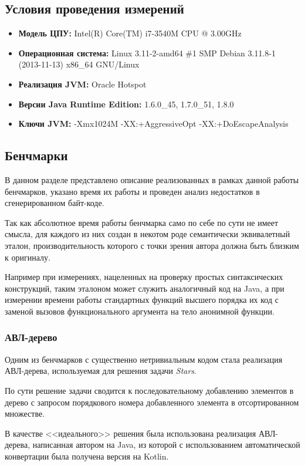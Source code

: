 \subsection{Условия проведения измерений}
\begin{itemize}
    \item \textbf{Модель ЦПУ:} Intel(R) Core(TM) i7-3540M CPU @ 3.00GHz
    \item \textbf{Операционная система:} Linux 3.11-2-amd64 \#1 SMP Debian 3.11.8-1 (2013-11-13) x86\_64 GNU/Linux
    \item \textbf{Реализация JVM:} Oracle Hotspot
    \item \textbf{Версии Java Runtime Edition:} 1.6.0\_45, 1.7.0\_51, 1.8.0
    \item \textbf{Ключи JVM:} -Xmx1024M -XX:+AggressiveOpt -XX:+DoEscapeAnalysis
\end{itemize}

\subsection{Бенчмарки}
В данном разделе представлено описание реализованных в рамках данной работы бенчмарков, указано
время их работы и проведен анализ недостатков в сгенерированном байт-коде.

Так как абсолютное время работы бенчмарка само по себе по сути не имеет смысла, для каждого из
них создан в некотом роде семантически эквивалетный эталон, производительность которого
с точки зрения автора должна быть близким к оригиналу.

Например при измерениях, нацеленных на проверку простых синтаксических конструкций, таким эталоном
может служить аналогичный код на Java, а при измерении времени работы стандартных функций высшего
порядка их код с заменой вызовов функционального аргумента на тело анонимной функции.

\subsubsection{АВЛ-дерево}
Одним из бенчмарков с существенно нетривиальным кодом стала реализация АВЛ-дерева, используемая
для решения задачи \textit{Stars}.

По сути решение задачи сводится к последовательному добавлению элементов в дерево с запросом
порядкового номера добавленного элемента в отсортированном множестве.

В качестве <<идеального>> решения была использована реализация АВЛ-дерева, написанная автором
на Java, из которой с использованием автоматической конвертации была получена версия на Kotlin.


